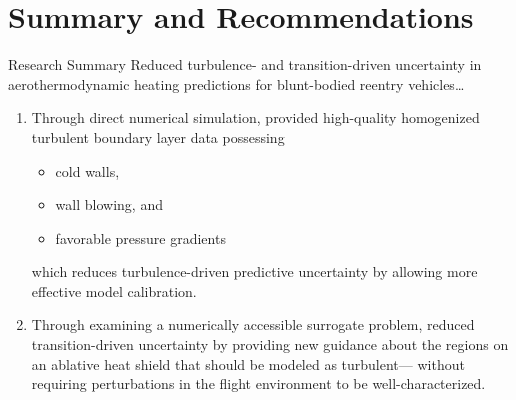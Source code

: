 \documentclass[mathserif]{beamer}
\begin{document}
\section{Summary and Recommendations}

\begin{frame}{Research Summary}
Reduced turbulence- and transition-driven uncertainty in aerothermodynamic
heating predictions for blunt-bodied reentry vehicles\ldots
\begin{enumerate}
 \item Through direct numerical simulation, provided high-quality
       homogenized turbulent boundary layer data possessing
   \begin{itemize}
     \item cold walls,
     \item wall blowing, and
     \item favorable pressure gradients
   \end{itemize}
       which reduces turbulence-driven predictive uncertainty by allowing
       more effective model calibration.
 \item Through examining a numerically accessible surrogate problem, reduced
       transition-driven uncertainty by providing new guidance about the regions
       on an ablative heat shield that should be modeled as turbulent--- without
       requiring perturbations in the flight environment to be well-characterized.
\end{enumerate}
\end{frame}
\end{document}
